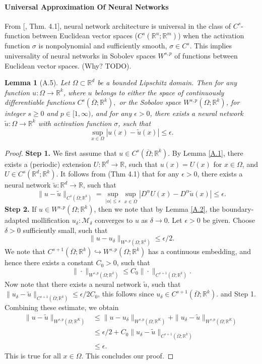 \documentclass[reqno]{amsart}
\theoremstyle{plain}
\newtheorem{lem}{Lemma}
\theoremstyle{definition}
\newcommand{\bb}[1]{\mathbb{#1}}
\newcommand{\cal}[1]{\mathcal{#1}}
\begin{document}
\paragraph{\bf Universal Approximation Of Neural Networks}
From [\cite{AP1999}, Thm. 4.1], neural network architecture is universal in the class of $C^s$- function between Euclidean vector spaces ($C^s(\bb R^n; \bb R^m)$) when the activation function $\sigma$ is nonpolynomial and sufficiently smooth, $\sigma \in C^s$. This implies universality of neural networks in Sobolev spaces $W^{s,p}$ of functions between Euclidean vector spaces. (Why? TODO).
\begin{lem}[A.5] \label{A.5}
    Let $\Omega \subset \bb R^d$ be a bounded Lipschitz domain. Then for any function $u : \Omega \to \bb R^k$, where $u$ belongs to either the space of continuously differentiable functions $C^s(\overline{\Omega};\bb R^k),$ or the Sobolov space $W^{s,p}(\Omega;\bb R^k)$, for integer $s \geq 0$ and $p \in [1,\infty)$, and for any $\epsilon > 0$, there exists a neural network $\tilde{u} : \Omega \to \bb R^k$ with activation function $\sigma$, such that
    $$ \sup_{x \in \Omega}|u(x) - \tilde{u}(x)| \leq \epsilon.$$
\end{lem}
\begin{proof}
    {\bf Step 1.} We first assume that $u \in C^s(\overline{\Omega};\bb R^k)$. By Lemma \ref{A.1}, there exists a (periodic) extension $U : \bb R^d \to \bb R$, such that $u(x) = U(x)$ for $x \in \Omega$, and $U \in C^s(\bb R^d;\bb R^k)$. It follows from \cite{AP1999}(Thm 4.1) that for any $\epsilon > 0$, there exists a neural network $\tilde{u} : \bb R^d \to \bb R$, such that
    $$ \|u - \tilde{u}\|_{C^s(\overline{\Omega};\bb R^k)} = \sup_{|\alpha| \leq s}\sup_{x\in \overline{\Omega}}|D^\alpha U(x) - D^\alpha \tilde{u}(x)| \leq \epsilon.$$
    {\bf Step 2.} If $u \in W^{s,p}(\Omega;\bb R^k)$, then we note that by Lemma \ref{A.2}, the boundary-adapted mollification $u_\delta:\cal M_\delta$ converges to $u$ as $\delta \to 0$. Let $\epsilon > 0$ be given. Choose $\delta > 0$ sufficiently small, such that
    $$ \|u - u_\delta\|_{W^{s,p}(\Omega;\bb R^k)} \leq \epsilon/2.$$
    We note that $C^{s+1}(\overline{\Omega};\bb R^k) \hookrightarrow W^{s,p}(\Omega;\bb R^k)$ has a continuous embedding, and hence there exists a constant $C_0 > 0$, such that
    $$ \|\cdot\|_{W^{s,p}(\Omega;\bb R^k)} \leq C_0 \|\cdot\|_{C^{s+1}(\Omega;\bb R^k)}.$$
    Now note that there exists a neural network $\tilde{u}$, such that $\|u_\delta - \tilde{u}\|_{C^{s+1}(\overline{\Omega};\bb R^k)} \leq \epsilon/2C_0$, this follows since $u_\delta \in C^{s+1}(\overline{\Omega};\bb R^k).$ and Step 1. Combining these estimate, we obtain
    $$
    \begin{aligned}
        \|u - \tilde{u}\|_{W^{s,p}(\Omega;\bb R^K)} &\leq \|u - u_\delta\|_{W^{s,p}(\Omega;\bb R^K)} + \|u_\delta - \tilde{u}\|_{W^{s,p}(\Omega;\bb R^K)} \\
        &\leq \epsilon/2 + C_0\|u_\delta - \tilde{u}\|_{C^{s+1}(\overline{\Omega};\bb R^k)}\\
        &\leq \epsilon.
    \end{aligned}
    $$
    This is true for all $x \in \Omega$. This concludes our proof.
\end{proof}
\end{document}
